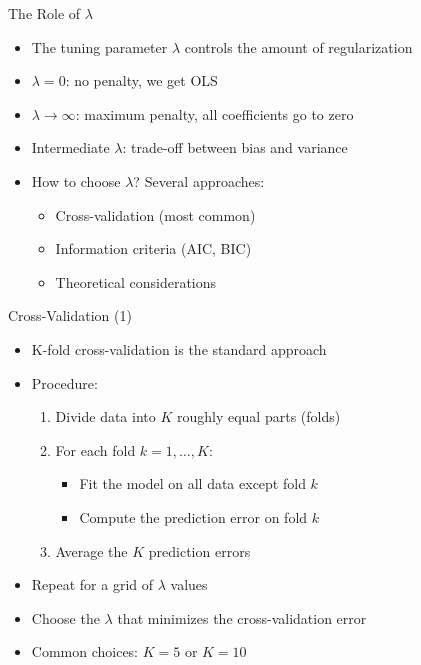 \documentclass[aspectratio=169]{beamer}
\begin{document}
\begin{frame}{The Role of $\lambda$}
\begin{itemize}
    \item The tuning parameter $\lambda$ controls the amount of regularization
    \item $\lambda = 0$: no penalty, we get OLS
    \item $\lambda \rightarrow \infty$: maximum penalty, all coefficients go to zero
    \item Intermediate $\lambda$: trade-off between bias and variance
    \item How to choose $\lambda$? Several approaches:
    \begin{itemize}
        \item Cross-validation (most common)
        \item Information criteria (AIC, BIC)
        \item Theoretical considerations
    \end{itemize}
\end{itemize}
\end{frame}

\begin{frame}{Cross-Validation (1)}
\begin{itemize}
    \item K-fold cross-validation is the standard approach
    \item Procedure:
    \begin{enumerate}
        \item Divide data into $K$ roughly equal parts (folds)
        \item For each fold $k = 1, \ldots, K$:
        \begin{itemize}
            \item Fit the model on all data except fold $k$
            \item Compute the prediction error on fold $k$
        \end{itemize}
        \item Average the $K$ prediction errors
    \end{enumerate}
    \item Repeat for a grid of $\lambda$ values
    \item Choose the $\lambda$ that minimizes the cross-validation error
    \item Common choices: $K = 5$ or $K = 10$
\end{itemize}
\end{frame}
\end{document}
